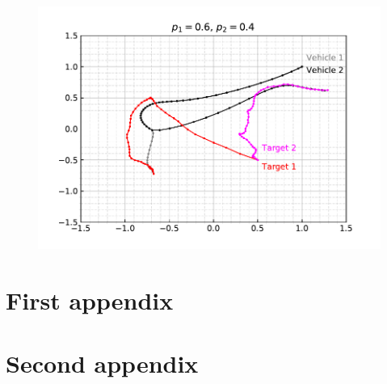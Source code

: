 \documentclass[12pt]{article}
\begin{document}
\begin{figure}[H]
    \centering
    \includegraphics{../../src/tasks_5-7/output/ex_7.pdf}
\end{figure}






\appendix  
\clearpage
\addappheadtotoc 
\appendixpage 

\section{First appendix}

\lipsum[1]

\section{Second appendix}

\lipsum[1]
\end{document}
